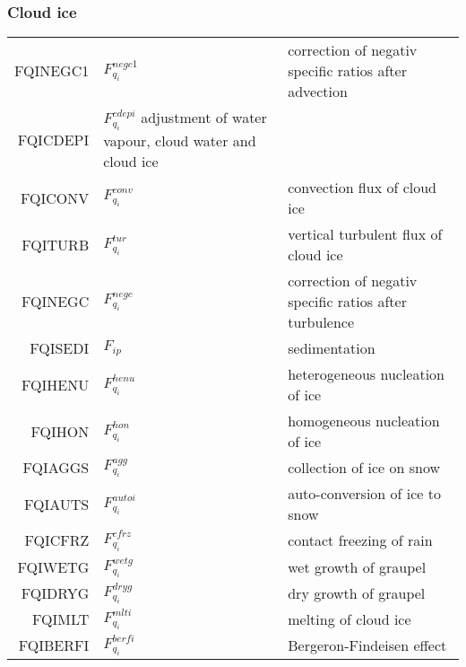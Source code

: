   \subsubsection{Cloud ice}
  \begin{tabular}{rll}

       FQINEGC1     &$F_{q_i}^{negc1}$ &correction of negativ specific ratios after advection\\
       FQICDEPI     &$F_{q_i}^{cdepi}$ adjustment of water vapour, cloud water and cloud ice\\
       FQICONV      &$F_{q_i}^{conv}$ &convection flux of cloud ice\\
       FQITURB      &$F_{q_i}^{tur}$  &vertical turbulent flux of cloud ice\\
       FQINEGC      &$F_{q_i}^{negc}$ &correction of negativ specific ratios after turbulence\\
       FQISEDI      &$F_{ip}$ &sedimentation\\
       FQIHENU      &$F_{q_i}^{henu}$ &heterogeneous nucleation of ice\\
       FQIHON       &$F_{q_i}^{hon}$ &homogeneous nucleation of ice\\
       FQIAGGS      &$F_{q_i}^{agg}$ &collection of ice on snow\\
       FQIAUTS      &$F_{q_i}^{autoi}$ &auto-conversion of ice to snow\\
       FQICFRZ      &$F_{q_i}^{cfrz}$ &contact freezing of rain\\
       FQIWETG      &$F_{q_i}^{wetg}$ &wet growth of graupel\\
       FQIDRYG      &$F_{q_i}^{dryg}$ &dry growth of graupel\\
       FQIMLT       &$F_{q_i}^{mlti}$ &melting of cloud ice\\
       FQIBERFI     &$F_{q_i}^{berfi}$ &Bergeron-Findeisen effect\\

  \end{tabular}


